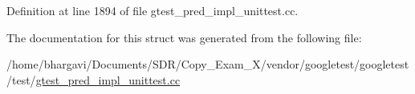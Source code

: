 Definition at line 1894 of file gtest\+\_\+pred\+\_\+impl\+\_\+unittest.\+cc.



The documentation for this struct was generated from the following file\+:\begin{DoxyCompactItemize}
\item 
/home/bhargavi/\+Documents/\+S\+D\+R/\+Copy\+\_\+\+Exam\+\_\+X/vendor/googletest/googletest/test/\hyperlink{gtest__pred__impl__unittest_8cc}{gtest\+\_\+pred\+\_\+impl\+\_\+unittest.\+cc}\end{DoxyCompactItemize}
